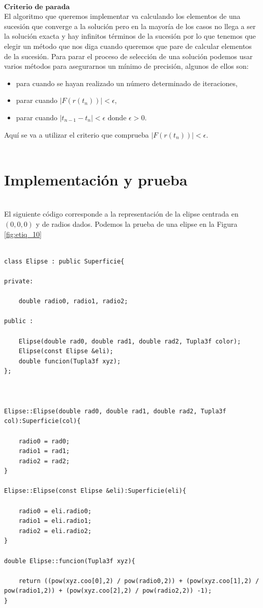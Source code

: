 ${ }$\\
$\textbf{Criterio de parada}$
${ }$\\

El algoritmo que queremos implementar va calculando los elementos de una sucesión que converge a la solución pero en la mayoría de los casos no llega a ser la solución exacta y hay infinitos términos de la sucesión por lo que tenemos que elegir un método que nos diga cuando queremos que pare de calcular elementos de la sucesión. Para parar el proceso de selección de una solución podemos usar varios métodos para asegurarnos un mínimo de precisión, algunos de ellos son:
\begin{itemize}
	\item para cuando se hayan realizado un número determinado de iteraciones,
	\item parar cuando $|F(r(t_n))| < \epsilon$,
	\item parar cuando $|t_{n-1} - t_n| < \epsilon$ donde $\epsilon > 0$.
\end{itemize}
Aquí se va a utilizar el criterio que comprueba $|F(r(t_n))| < \epsilon$.
${ }$\\




${ }$\\
\section{Implementación y prueba}
${ }$\\

El siguiente código corresponde a la representación de la elipse centrada en $(0,0,0)$ y de radios dados. Podemos la prueba de una elipse en la Figura \ref{fig:etiq_10}
${ }$\\

\begin{lstlisting}[style=Consola]

class Elipse : public Superficie{

private:

	double radio0, radio1, radio2;

public :

	Elipse(double rad0, double rad1, double rad2, Tupla3f color);
	Elipse(const Elipse &eli);
	double funcion(Tupla3f xyz);
};



Elipse::Elipse(double rad0, double rad1, double rad2, Tupla3f col):Superficie(col){

	radio0 = rad0;
	radio1 = rad1;
	radio2 = rad2;
}

Elipse::Elipse(const Elipse &eli):Superficie(eli){

	radio0 = eli.radio0;
	radio1 = eli.radio1;
	radio2 = eli.radio2;
}

double Elipse::funcion(Tupla3f xyz){

	return ((pow(xyz.coo[0],2) / pow(radio0,2)) + (pow(xyz.coo[1],2) / pow(radio1,2)) + (pow(xyz.coo[2],2) / pow(radio2,2)) -1);
}
\end{lstlisting}
${ }$\\




